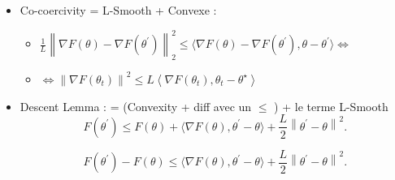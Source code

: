 \documentclass{article}
\theoremstyle{plain}%
\theoremstyle{definition}
\theoremstyle{remark}
\begin{document}
\begin{itemize}
    \item Co-coercivity = L-Smooth + Convexe : \begin{itemize}
        \item $ \frac{1}{L} \left\| \nabla F(\theta ) - \nabla F(\theta ^\prime ) \right\| ^2 _2 \leq  \langle  \nabla F(\theta ) - \nabla F(\theta ^\prime ), \theta  - \theta ^\prime \rangle \Leftrightarrow $ 
        \item $\Leftrightarrow \left\| \nabla F(\theta _t) \right\|^2 \leq L \left\langle \nabla F(\theta _t), \theta _t - \theta ^\star  \right\rangle  $ 
    \end{itemize}
    \item Descent Lemma : = (Convexity + diff avec un $ \leq  $ ) + le terme L-Smooth
    \[
        F(\theta ^\prime ) \leq  F(\theta ) + \langle \nabla F(\theta ) , \theta ^\prime  - \theta \rangle + \frac{L}{2} \left\| \theta ^\prime  - \theta  \right\| ^2
    .\]
    
    \[
        F(\theta ^\prime ) - F(\theta ) \leq  \langle \nabla F(\theta ) , \theta ^\prime  - \theta \rangle + \frac{L}{2} \left\| \theta ^\prime  - \theta  \right\| ^2
    .\]
\end{itemize}
\end{document}
